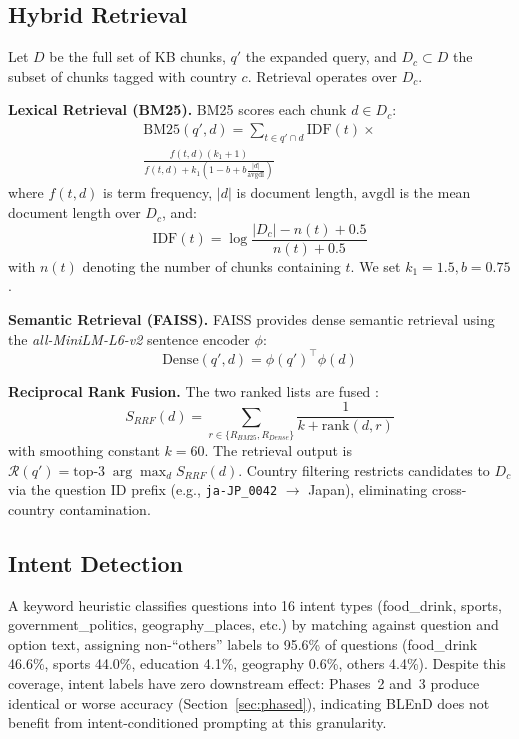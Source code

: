 \documentclass[11pt,a4paper]{article}
\begin{document}
\subsection{Hybrid Retrieval}
Let $D$ be the full set of KB chunks, $q'$ the expanded query, and $D_c \subset D$ the subset of chunks tagged with country $c$. Retrieval operates over $D_c$.

\textbf{Lexical Retrieval (BM25).} BM25 \cite{robertson2009bm25} scores each chunk $d \in D_c$:
\begin{equation}
\begin{split}
    \text{BM25}(q', d) = \sum_{t \in q' \cap d} \text{IDF}(t) \times \\
    \frac{f(t, d)(k_1 + 1)}{f(t, d) + k_1(1 - b + b \frac{|d|}{\text{avgdl}})}
\end{split}
\end{equation}
where $f(t,d)$ is term frequency, $|d|$ is document length, $\text{avgdl}$ is the mean document length over $D_c$, and:
\begin{equation}
    \text{IDF}(t) = \log \frac{|D_c| - n(t) + 0.5}{n(t) + 0.5}
\end{equation}
with $n(t)$ denoting the number of chunks containing $t$. We set $k_1=1.5, b=0.75$.

\textbf{Semantic Retrieval (FAISS).} FAISS \cite{johnson2019faiss} provides dense semantic retrieval using the \textit{all-MiniLM-L6-v2} sentence encoder \cite{reimers2019sbert} $\phi$:
\begin{equation}
    \text{Dense}(q', d) = \phi(q')^\top \phi(d)
\end{equation}

\textbf{Reciprocal Rank Fusion.} The two ranked lists are fused \cite{cormack2009rrf}:
\begin{equation}
    S_{RRF}(d) = \sum_{r \in \{R_{BM25}, R_{Dense}\}} \frac{1}{k + \text{rank}(d, r)}
\end{equation}
with smoothing constant $k=60$. The retrieval output is $\mathcal{R}(q') = \text{top-}3 \; \arg\!\max_d S_{RRF}(d)$. Country filtering restricts candidates to $D_c$ via the question ID prefix (e.g., \texttt{ja-JP\_0042} $\rightarrow$ Japan), eliminating cross-country contamination.

\subsection{Intent Detection}
\label{sec:intent}
A keyword heuristic classifies questions into 16 intent types (food\_drink, sports, government\_politics, geography\_places, etc.) by matching against question and option text, assigning non-``others'' labels to 95.6\% of questions (food\_drink 46.6\%, sports 44.0\%, education 4.1\%, geography 0.6\%, others 4.4\%). Despite this coverage, intent labels have zero downstream effect: Phases~2 and~3 produce identical or worse accuracy (Section~\ref{sec:phased}), indicating BLEnD does not benefit from intent-conditioned prompting at this granularity.
\end{document}
